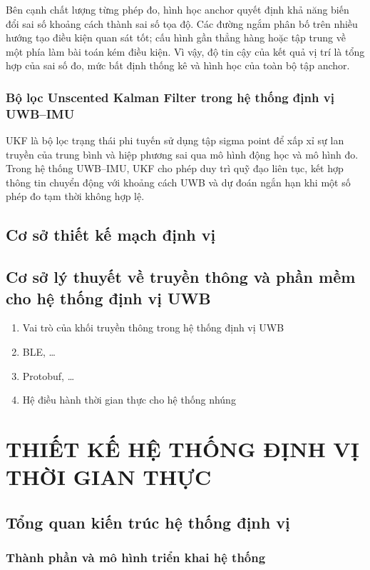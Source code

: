 \documentclass[
  a4paper,
]{report}
\begin{document}
Bên cạnh chất lượng từng phép đo, hình học anchor quyết định khả năng biến đổi
sai số khoảng cách thành sai số tọa độ. Các đường ngắm phân bố trên nhiều
hướng tạo điều kiện quan sát tốt; cấu hình gần thẳng hàng hoặc tập trung về
một phía làm bài toán kém điều kiện. Vì vậy, độ tin cậy của kết quả vị trí là
tổng hợp của sai số đo, mức bất định thống kê và hình học của toàn bộ tập
anchor.

\subsection{Bộ lọc Unscented Kalman Filter trong hệ thống định vị UWB--IMU}

UKF là bộ lọc trạng thái phi tuyến sử dụng tập sigma point để xấp xỉ sự lan
truyền của trung bình và hiệp phương sai qua mô hình động học và mô hình đo.
Trong hệ thống UWB--IMU, UKF cho phép duy trì quỹ đạo liên tục, kết hợp thông
tin chuyển động với khoảng cách UWB và dự đoán ngắn hạn khi một số phép đo
tạm thời không hợp lệ.
\section{Cơ sở thiết kế mạch định vị}

\section{Cơ sở lý thuyết về truyền thông và phần mềm cho hệ thống định vị UWB}

\begin{enumerate}
\def\labelenumi{\arabic{enumi}.}
\item
  Vai trò của khối truyền thông trong hệ thống định vị UWB
\item
  BLE, \ldots{}
\item
  Protobuf, \ldots{}
\item
  Hệ điều hành thời gian thực cho hệ thống nhúng
\end{enumerate}

\chapter{THIẾT KẾ HỆ THỐNG ĐỊNH VỊ THỜI GIAN THỰC}

\section{Tổng quan kiến trúc hệ thống định vị}

\subsection{Thành phần và mô hình triển khai hệ thống}
\end{document}
